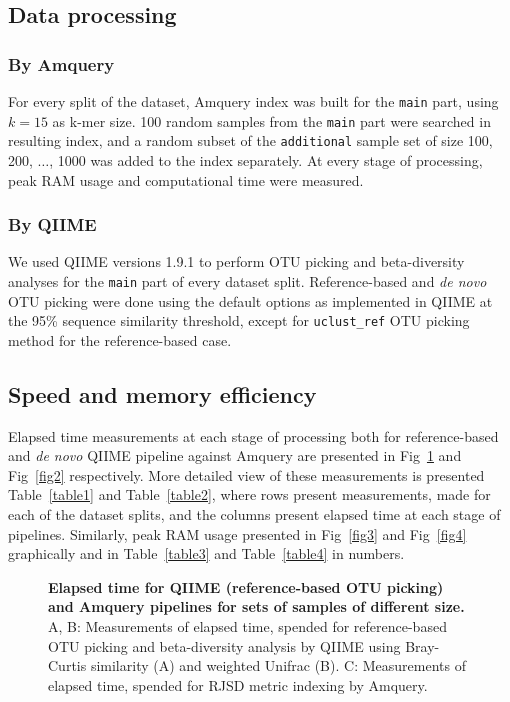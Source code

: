 \documentclass[10pt,letterpaper]{article}
\begin{document}
\subsection*{Data processing}
\subsubsection*{By Amquery}
For every split of the dataset, Amquery index was built for the \texttt{main} part, using $k=15$ as k-mer size. 100 random samples from the \texttt{main} part were searched in resulting index,
and a random subset of the \texttt{additional} sample set of size 100, 200, $\dots$, 1000 was added to the index separately. At every stage of processing, peak RAM usage and computational time were measured.

\subsubsection*{By QIIME}
We used QIIME versions 1.9.1 to perform OTU picking and beta-diversity analyses for the \texttt{main} part of every dataset split.
Reference-based and \textit{de novo} OTU picking were done using the default options as implemented in QIIME at the 95\% sequence similarity threshold, 
except for \texttt{uclust\_ref} OTU picking method for the reference-based case.

\subsection*{Speed and memory efficiency}
Elapsed time measurements at each stage of processing both for reference-based and \textit{de novo} QIIME pipeline against Amquery are presented in Fig~\ref{fig1} and Fig~\ref{fig2} respectively.
More detailed view of these measurements is presented Table~\ref{table1} and Table~\ref{table2},
where rows present measurements, made for each of the dataset splits, and the columns present elapsed time at each stage of pipelines. 
Similarly, peak RAM usage presented in Fig~\ref{fig3} and Fig~\ref{fig4} graphically and in Table~\ref{table3} and Table~\ref{table4} in numbers.


\begin{figure}[!h]
\caption{{\bf Elapsed time for QIIME (reference-based OTU picking) and Amquery pipelines for sets of samples of different size.}
A, B: Measurements of elapsed time, spended for reference-based OTU picking and beta-diversity analysis by QIIME using Bray-Curtis similarity (A) and weighted Unifrac (B). 
C: Measurements of elapsed time, spended for RJSD metric indexing by Amquery.}
\label{fig1}
\end{figure}
\end{document}
